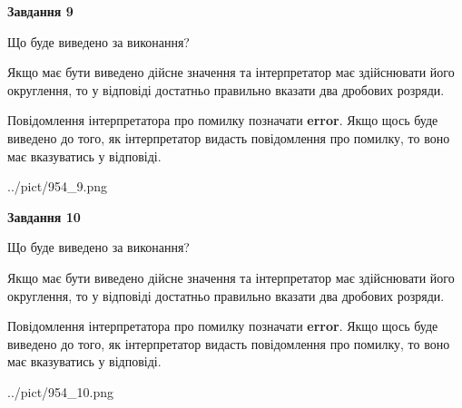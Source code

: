 \documentclass[12pt, ukrainian]{article}
\begin{document}
{\begin {Large}
{\begin {center}\textbf{Завдання 9}\end {center}}\par
Що буде виведено за виконання? \par

Якщо має бути виведено дійсне значення та інтерпретатор має здійснювати його округлення, 
то у відповіді достатньо правильно вказати два дробових розряди.

Повідомлення інтерпретатора про помилку позначати \textbf{error}.
Якщо щось буде виведено до того, як інтерпретатор видасть повідомлення про помилку, 
то воно має вказуватись у відповіді. \par

\begin{center}
	{../pict/954_9.png}
\end{center}
\newpage

{\begin {center}\textbf{Завдання 10}\end {center}}\par
Що буде виведено за виконання? \par

Якщо має бути виведено дійсне значення та інтерпретатор має здійснювати його округлення, 
то у відповіді достатньо правильно вказати два дробових розряди.

Повідомлення інтерпретатора про помилку позначати \textbf{error}.
Якщо щось буде виведено до того, як інтерпретатор видасть повідомлення про помилку, 
то воно має вказуватись у відповіді. \par

\begin{center}
	{../pict/954_10.png}
\end{center}
\newpage

\end {Large}}
\end{document}
